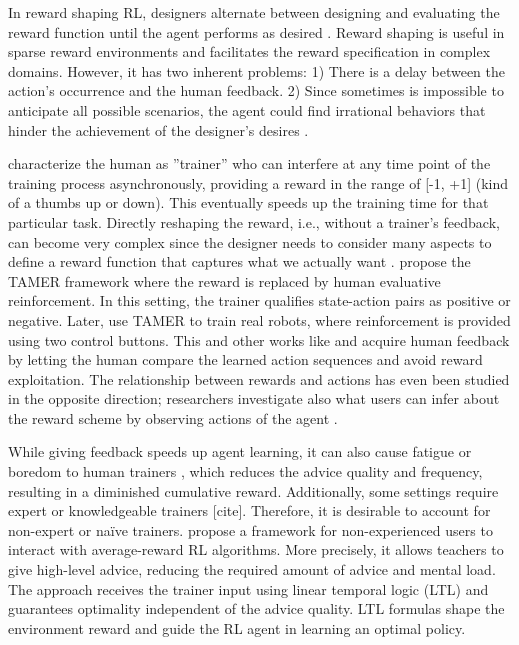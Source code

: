 \documentclass[twoside,11pt]{article}
\begin{document}
In reward shaping RL, designers alternate between designing and evaluating the reward function until the agent performs as desired \citep{ng:99}. Reward shaping is useful in sparse reward environments and facilitates the reward specification in complex domains. However, it has two inherent problems: 1) There is a delay between the action's occurrence and the human feedback. 2) Since sometimes is impossible to anticipate all possible scenarios, the agent could find irrational behaviors that hinder the achievement of the designer's desires \citep{Arzate:2020:SurveyInteractiveRL}. 

 \cite{Thomaz:2006:RLWithHumanTeachers} characterize the human as ''trainer'' who can interfere at any time point of the training process asynchronously, providing a reward in the range of [-1, +1] (kind of a thumbs up or down). This eventually speeds up the training time for that particular task. Directly reshaping the reward, i.e., without a trainer's feedback,  can become very complex since the designer needs to consider many aspects to define a reward function that captures what we actually want \citep{hadfield:17}.  \cite{Knox:2008:TAMER} propose the TAMER framework where the reward is replaced by human evaluative reinforcement. In this setting, the trainer qualifies state-action pairs as positive or negative. Later, \cite{knox:13} use TAMER to train real robots, where reinforcement is provided using two control buttons. This and other works like \cite{Christiano:2017:DeepRLHumanPreferences} and \cite{LeeSmithAbbeel:2021:FeedbackPreferenceHITLLearningPEBBLE} acquire human feedback by letting the human compare the learned action sequences and avoid reward exploitation. The relationship between rewards and actions has even been studied in the opposite direction; researchers investigate also what users can infer about the reward scheme by observing actions of the agent \citep{Abbeel:2004:InverseRL}. 

While giving feedback speeds up agent learning, it can also cause fatigue or boredom to human trainers \citep{akalin:21}, which reduces the advice quality and frequency, resulting in a diminished cumulative reward. Additionally, some settings require expert or knowledgeable trainers [cite]. Therefore, it is desirable to account for non-expert or na\"ive trainers. \cite{jiang:21} propose a framework for non-experienced users to interact with average-reward RL algorithms. More precisely, it allows teachers to give high-level advice, reducing the required amount of advice and mental load. The approach receives the trainer input using linear temporal logic (LTL) and guarantees optimality independent of the advice quality. LTL formulas shape the environment reward and guide the RL agent in learning an optimal policy.
  
\end{document}
